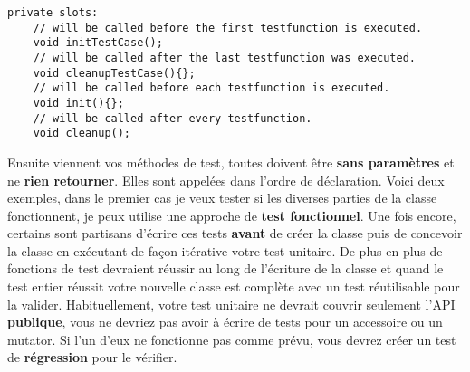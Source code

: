 \begin{verbatim}
private slots:
    // will be called before the first testfunction is executed.
    void initTestCase();
    // will be called after the last testfunction was executed.
    void cleanupTestCase(){};
    // will be called before each testfunction is executed.
    void init(){};
    // will be called after every testfunction.
    void cleanup();
\end{verbatim}

Ensuite viennent vos m\'ethodes de test, toutes doivent \^etre \textbf{sans param\`etres} et ne \textbf{rien retourner}. Elles sont appel\'ees dans l'ordre de d\'eclaration. Voici deux exemples, dans le premier cas je veux tester si les diverses parties de la classe fonctionnent, je peux utilise une approche de \textbf{test fonctionnel}. Une fois encore, certains sont partisans d'\'ecrire ces tests \textbf{avant} de cr\'eer la classe puis de concevoir la classe en ex\'ecutant de fa\c{c}on it\'erative votre test unitaire. De plus en plus de fonctions de test devraient r\'eussir au long de l'\'ecriture de la classe et quand le test entier r\'eussit votre nouvelle classe est compl\`ete avec un test r\'eutilisable pour la valider.
Habituellement, votre test unitaire ne devrait couvrir seulement l'API \textbf{publique}, vous ne devriez pas avoir \`a \'ecrire de tests pour un accessoire ou un mutator. Si l'un d'eux ne fonctionne pas comme pr\'evu, vous devrez cr\'eer un test de \textbf{r\'egression} pour le v\'erifier.

